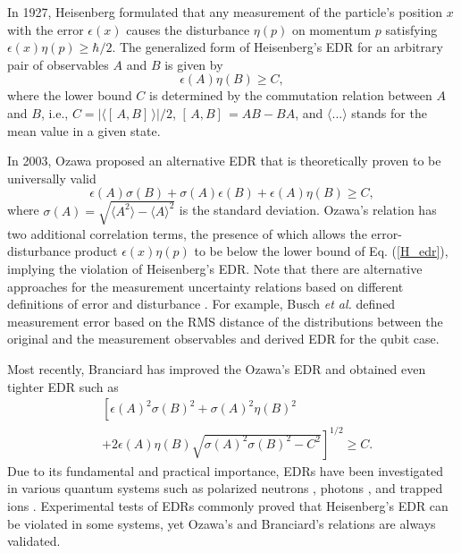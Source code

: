 \documentclass[%
reprint,
superscriptaddress,
 amsmath,amssymb,
 aps,
pra,
]{revtex4-2}
\begin{document}
In 1927, Heisenberg  \cite{heisenberg1927} formulated that any measurement of the particle’s position $x$ with the error $\epsilon(x)$ causes the disturbance $\eta(p)$ on momentum $p$ satisfying $\epsilon(x)\eta(p)\geq\hbar/2$. The generalized form of Heisenberg’s EDR for an arbitrary pair of observables $A$ and $B$ is given by  
\begin{equation}
\label{H_edr}
\epsilon(A)\eta(B)\geq C,
\end{equation}
where the lower bound $C$ is determined by the commutation relation between $A$ and $B$, i.e., $C = | \langle [ \, A, B ] \,\rangle | /2$, $ [ \, A, B] \,=AB-BA$, and $ \langle ... \rangle$ stands for the mean value in a given state.

In 2003, Ozawa \cite{PhysRevA.67.042105} proposed an alternative EDR that is theoretically proven to be universally valid 
\begin{equation}
\label{O_edr}
\epsilon(A)\sigma(B) + \sigma(A)\epsilon(B) +\epsilon(A)\eta(B) \geq C,
\end{equation}
where $\sigma(A) = \sqrt{\langle A^2 \rangle - \langle A \rangle ^2}$ is the standard deviation. 
Ozawa’s relation has two additional correlation terms, the presence of which allows the error-disturbance product $\epsilon(x)\eta(p)$ to be below the lower bound of Eq. (\ref{H_edr}), implying the violation of Heisenberg's EDR.
Note that there are alternative approaches for the measurement uncertainty relations based on different definitions of error and disturbance \cite{Edamatsu_2016, PhysRevA.68.032103, PhysRevA.84.042121, PhysRevLett.111.160405, COLES2015105, PhysRevLett.115.030401}. 
For example, Busch \textit{et al.} \cite{PhysRevA.89.012129} defined measurement error based on the RMS distance of the distributions between the original and the measurement observables and derived EDR for the qubit case. 

Most recently, Branciard \cite{branciard2013error} has improved the Ozawa’s EDR and obtained even tighter EDR such as 
\begin{equation}
\label{B_edr}
\begin{aligned}
& \left[ \epsilon(A)^2\sigma(B)^2+\sigma(A)^2\eta(B)^2   \right. \\
 &\left. + 2\epsilon(A)\eta(B) \sqrt{\sigma(A)^2 \sigma(B)^2- C^2} \right]^{1/2}  \geq C.
\end{aligned} 
\end{equation}
Due to its fundamental and practical importance, EDRs have been investigated in various quantum systems such as polarized neutrons \cite{Erhart2012, PhysRevA.88.022110}, photons \cite{10.1103/physrevlett.109.100404, Baek2013, PhysRevLett.110.220402, PhysRevLett.112.020401, PhysRevLett.112.020402}, and trapped ions \cite{doi:10.1126/sciadv.1600578}.
Experimental tests of EDRs commonly proved that Heisenberg’s EDR can be violated in some systems, yet Ozawa’s and Branciard’s relations are always validated. 
 
\end{document}
